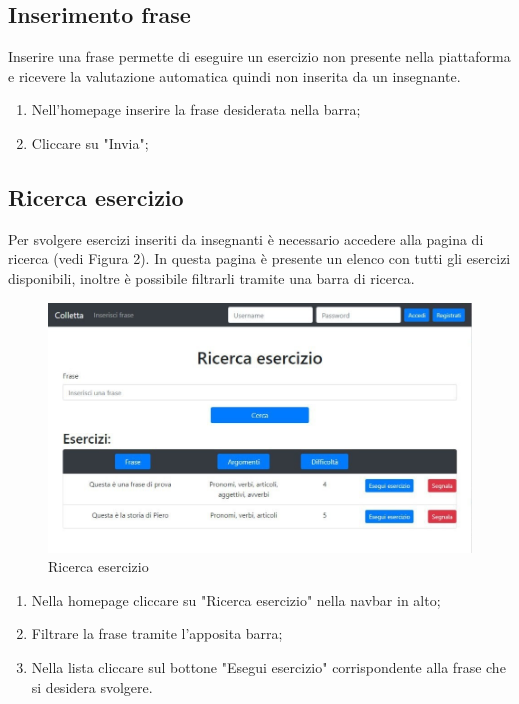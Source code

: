 \documentclass[11pt,a4paper]{article}
\begin{document}
{	\subsection{Inserimento frase}
	Inserire una frase permette di eseguire un esercizio non presente nella piattaforma e ricevere la valutazione automatica quindi non inserita da un insegnante.	
	\begin{enumerate}
		\item Nell'homepage inserire la frase desiderata nella barra;
		\item Cliccare su "Invia";
		
	\end{enumerate}

	\subsection{Ricerca esercizio}
	Per svolgere esercizi inseriti da insegnanti è necessario accedere alla pagina di ricerca (vedi Figura 2). In questa pagina è presente un elenco con tutti gli esercizi disponibili, inoltre è possibile filtrarli tramite una barra di ricerca.
	
	\begin{figure}[h]
		\centering
		\includegraphics[scale=0.65]{images/ricerca.jpg}
		\caption{Ricerca esercizio}
	\end{figure}

	\begin{enumerate}
		\item Nella homepage cliccare su "Ricerca esercizio" nella navbar in alto;
		\item Filtrare la frase tramite l'apposita barra;
		\item Nella lista cliccare sul bottone "Esegui esercizio" corrispondente alla frase che si desidera svolgere.
	\end{enumerate}
	
}
\end{document}
